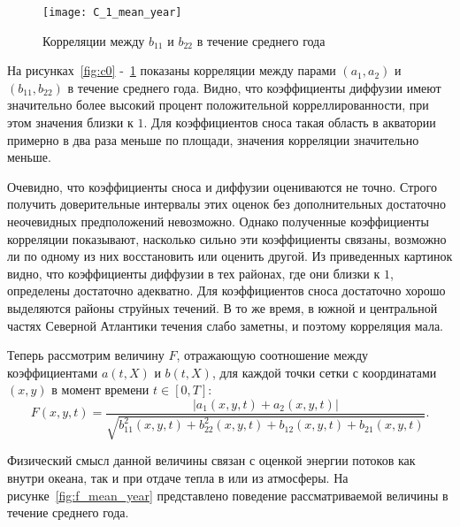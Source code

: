 \begin{figure}[h!]
	\centering
	\texttt{[image: C\_1\_mean\_year]}
	\caption{Корреляции между $b_{11}$ и $b_{22}$ в течение среднего года}
	\label{fig:c1}
\end{figure}

На рисунках~\ref{fig:c0} -~\ref{fig:c1} показаны корреляции между парами $(a_1, a_2)$ и $(b_{11}, b_{22})$ в течение среднего года. Видно, что коэффициенты диффузии имеют значительно более высокий процент положительной корреллированности, при этом значения близки к $1$. Для коэффициентов сноса такая область в акватории примерно в два раза меньше по площади, значения корреляции значительно меньше. 

Очевидно, что коэффициенты сноса и диффузии оцениваются не точно. Строго получить доверительные интервалы этих оценок без дополнительных достаточно неочевидных предположений невозможно. Однако полученные коэффициенты корреляции показывают, насколько сильно эти коэффициенты связаны, возможно ли по одному из них восстановить или оценить другой. Из приведенных картинок видно, что коэффициенты диффузии в тех районах, где они близки к $1$, определены достаточно адекватно. Для коэффициентов сноса достаточно хорошо выделяются районы струйных течений. В то же время, в южной и центральной частях Северной Атлантики течения слабо заметны, и поэтому корреляция мала.

Теперь рассмотрим величину $F$, отражающую соотношение между коэффициентами $a(t,X)$ и $b(t,X)$, для каждой точки сетки с координатами $(x,y)$ в момент времени $t \in [0,T]$: 
\begin{equation}
	F(x,y,t) = \frac{|a_1(x,y,t) + a_2(x,y,t)|}{\sqrt{b_{11}^2(x,y,t) + b_{22}^2(x,y,t) + b_{12}(x,y,t) + b_{21}(x,y,t)}}.
\end{equation}

Физический смысл данной величины связан с оценкой энергии потоков как внутри океана, так и при отдаче тепла в или из атмосферы. 
На рисунке~\ref{fig:f_mean_year} представлено поведение рассматриваемой величины в течение среднего года.

